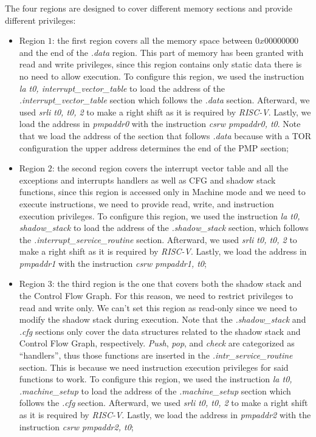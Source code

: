 The four regions are designed to cover different memory sections and provide different
privileges:
\begin{itemize}
  \item Region $1$: the first region covers all the memory space between
    $0x00000000$ and the end of the \textit{.data} region. This part of memory
    has been granted with read and write privileges, since this region contains only
    static data there is no need to allow execution. To configure this region, we
    used the instruction \textit{la t0, interrupt\_vector\_table} to load the
    address of the \textit{.interrupt\_vector\_table} section which follows the \textit{.data}
    section. Afterward, we used \textit{srli t0, t0, 2} to make a right shift as
    it is required by \textit{RISC-V}. Lastly, we load the address in \textit{pmpaddr0}
    with the instruction \textit{csrw pmpaddr0, t0}. Note that we load the address
    of the section that follows \textit{.data} because with a TOR configuration
    the upper address determines the end of the PMP section;

  \item Region $2$: the second region covers the interrupt vector table and all
    the exceptions and interrupts handlers as well as CFG and shadow stack
    functions, since this region is accessed only in Machine mode and we need to
    execute instructions, we need to provide read, write, and instruction
    execution privileges. To configure this region, we used the instruction
    \textit{la t0, shadow\_stack} to load the address of the \textit{.shadow\_stack}
    section, which follows the \textit{.interrupt\_service\_routine} section. Afterward,
    we used \textit{srli t0, t0, 2} to make a right shift as it is required by \textit{RISC-V}.
    Lastly, we load the address in \textit{pmpaddr1} with the instruction \textit{csrw
    pmpaddr1, t0};

  \item Region $3$: the third region is the one that covers both the shadow
    stack and the Control Flow Graph. For this reason, we need to restrict
    privileges to read and write only. We can't set this region as read-only since
    we need to modify the shadow stack during execution. Note that the \textit{.shadow\_stack}
    and \textit{.cfg} sections only cover the data structures related to the
    shadow stack and Control Flow Graph, respectively. \textit{Push}, \textit{pop},
    and \textit{check} are categorized as ``handlers'', thus those functions are
    inserted in the \textit{.intr\_service\_routine} section. This is because we
    need instruction execution privileges for said functions to work. To configure
    this region, we used the instruction \textit{la t0, .machine\_setup} to load
    the address of the \textit{.machine\_setup} section which follows the
    \textit{.cfg} section. Afterward, we used \textit{srli t0, t0, 2} to make a
    right shift as it is required by \textit{RISC-V}. Lastly, we load the address
    in \textit{pmpaddr2} with the instruction \textit{csrw pmpaddr2, t0};


\end{itemize}
